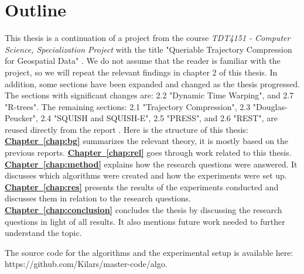\section{Outline}
This thesis is a continuation of a project from the course \textit{TDT4151 - Computer Science, Specialization Project} with the title "Queriable Trajectory Compression for Geospatial Data" \cite{Project2023}. We do not assume that the reader is familiar with the project, so we will repeat the relevant findings in chapter 2 of this thesis. In addition, some sections have been expanded and changed as the thesis progressed. The sections with significant changes are: 2.2 "Dynamic Time Warping", and 2.7 "R-trees". The remaining sections: 2.1 "Trajectory Compression", 2.3 "Douglas-Peucker", 2.4 "SQUISH and SQUISH-E", 2.5 "PRESS", and 2.6 "REST", are reused directly from the report \cite{Project2023}. Here is the structure of this thesis:\newline
\textbf{\hyperref[chap:bg]{Chapter~\ref*{chap:bg}}} summarizes the relevant theory, it is mostly based on the previous reports.
\newline
\textbf{\hyperref[chap:rel]{Chapter~\ref*{chap:rel}}} goes through work related to this thesis.
\newline
\textbf{\hyperref[chap:method]{Chapter~\ref*{chap:method}}} explains how the research questions were answered. It discusses which algorithms were created and how the experiments were set up.
\newline
\textbf{\hyperref[chap:res]{Chapter~\ref*{chap:res}}} presents the results of the experiments conducted and discusses them in relation to the research questions.
\newline
\textbf{\hyperref[chap:conclusion]{Chapter~\ref*{chap:conclusion}}} concludes the thesis by discussing the research questions in light of all results. It also mentions future work needed to further understand the topic.

The source code for the algorithms and the experimental setup is available here: https://github.com/Kilars/master-code/algo.

